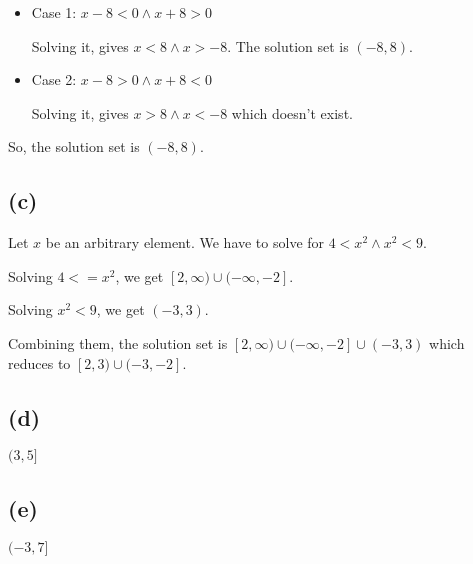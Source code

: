 \documentclass{article}
\begin{document}
\begin{itemize}
\item Case 1: $x - 8 < 0 \land  x + 8 > 0$

  Solving it, gives $x < 8 \land x > -8$. The solution set is
  $(-8, 8)$.
  
\item Case 2: $x - 8 > 0 \land x + 8 < 0$

  Solving it, gives $x > 8 \land x < -8$ which doesn't exist.

\end{itemize}

So, the solution set is $(-8, 8)$.

\subsection{(c)}

Let $x$ be an arbitrary element. We have to solve for
$4 < x^2 \land x^2 < 9$.

Solving $4 <= x^2$, we get $[2, \infty) \cup (-\infty, -2]$.

Solving $x^2 < 9$, we get $(-3, 3)$.

Combining them, the solution set is
$[2, \infty) \cup (-\infty, -2] \cup (-3, 3)$ which reduces to
$[2,3) \cup (-3,-2]$.

\subsection{(d)}

$(3,5]$

\subsection{(e)}

$(-3, 7]$
\end{document}
